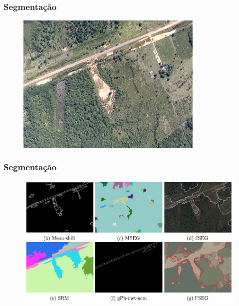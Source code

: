 \documentclass[t]{beamer}
\begin{document}
\begin{frame}[c]
	\frametitle{Segmentação}

	\begin{figure}[c]
  		\centering
		\includegraphics[width=0.8\textwidth]{imgs/seg_original}
	\end{figure}

\end{frame}

\begin{frame}[c]
	\frametitle{Segmentação}

	\begin{figure}[c]
		\centering
		\includegraphics[width=\textwidth]{imgs/gambi_apresentacao}
	\end{figure}

\end{frame}
\end{document}
